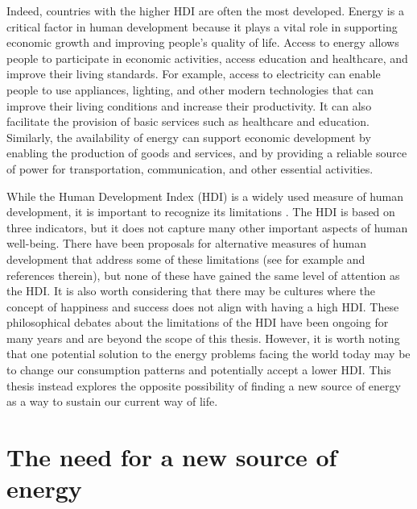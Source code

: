 \documentclass[my_thesis.tex]{subfiles}
\begin{document}
Indeed, countries with the higher HDI are often the most developed. Energy is a critical factor in human development because it plays a vital role in supporting economic growth and improving people's quality of life. Access to energy allows people to participate in economic activities, access education and healthcare, and improve their living standards. For example, access to electricity can enable people to use appliances, lighting, and other modern technologies that can improve their living conditions and increase their productivity. It can also facilitate the provision of basic services such as healthcare and education. Similarly, the availability of energy can support economic development by enabling the production of goods and services, and by providing a reliable source of power for transportation, communication, and other essential activities.

While the Human Development Index (HDI) is a widely used measure of human development, it is important to recognize its limitations \citep{mcgillivrayMeasuringDevelopmentUNDP1993a,bagolinHumanDevelopmentIndex2008,dervisMeasuringHumanProgress2011}. The HDI is based on three indicators, but it does not capture many other important aspects of human well-being. There have been proposals for alternative measures of human development that address some of these limitations (see for example \citep{biggeriMoreSustainableHuman2018} and references therein), but none of these have gained the same level of attention as the HDI. It is also worth considering that there may be cultures where the concept of happiness and success does not align with having a high HDI. These philosophical debates about the limitations of the HDI have been ongoing for many years and are beyond the scope of this thesis. However, it is worth noting that one potential solution to the energy problems facing the world today may be to change our consumption patterns and potentially accept a lower HDI. This thesis instead explores the opposite possibility of finding a new source of energy as a way to sustain our current way of life.

\section{The need for a new source of energy}
\end{document}
